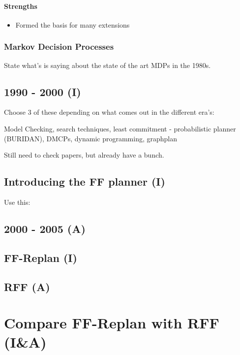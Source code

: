 \documentclass[runningheads,a4paper]{llncs}
\begin{document}
\paragraph{Strengths}

\begin{itemize}
	\item Formed the basis for many extensions

\end{itemize}

\subsubsection{Markov Decision Processes}

State what's \cite{monahan1982state} is saying about the state of the art MDPs
in the 1980s.

\subsection{1990 - 2000 (I)}
Choose 3 of these depending on what comes out in the different era's:

Model Checking, search techniques, least commitment - probabilistic planner (BURIDAN), DMCPs, dynamic programming, graphplan

Still need to check papers, but already have a bunch.


\subsection{Introducing the FF planner (I)}

Use this: \cite{Hoffmann01theff}

\subsection{2000 - 2005 (A)}

\subsection{FF-Replan (I)}

\subsection{RFF (A)}

\section{Compare FF-Replan with RFF (I\&A)}
\end{document}
